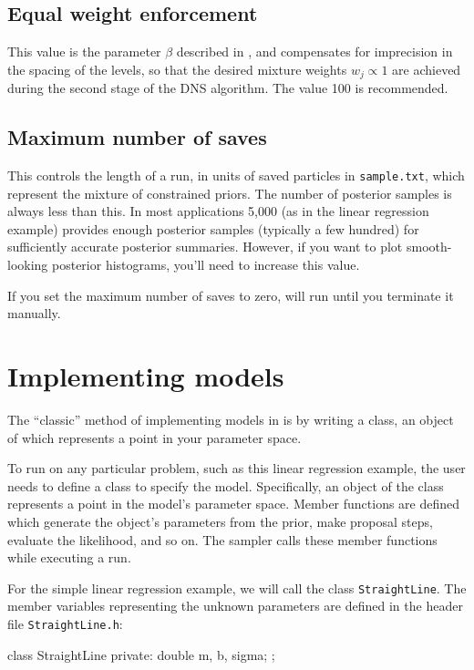 \documentclass[article, nojss]{jss}
\begin{document}
\subsection{Equal weight enforcement}
This value is the parameter $\beta$ described in
\citet{brewer2011diffusive}, and compensates
for imprecision in the spacing of the levels, so that the desired mixture
weights $w_j \propto 1$ are achieved during the second stage of the DNS
algorithm. The value 100 is recommended.

\subsection{Maximum number of saves}
This controls the length of a  run, in units of saved particles
in {\tt sample.txt}, which represent the mixture of constrained priors.
The number of posterior samples is always less than this. In most applications
5,000 (as in the linear regression example) provides enough posterior
samples (typically a few hundred) for sufficiently accurate posterior
summaries. However, if you want to plot smooth-looking posterior histograms,
you'll need to increase this value.

If you set the maximum number of saves to zero,  will run until
you terminate it manually.

\section{Implementing models}\label{sec:models}
The ``classic'' method of implementing models in  is by
writing a  class, an object of which represents a
point in your parameter space.

To run  on any particular problem, such as this linear regression
example, the user needs to define a  class to specify the
model. Specifically, an object of the class represents a point in the
model's parameter space. Member functions are defined which generate
the object's parameters from the prior, make proposal steps, evaluate the
likelihood, and so on. The sampler calls these member functions while
executing a run.

For the simple linear regression example, we will call the class
{\tt StraightLine}. The member variables representing the
unknown parameters are defined in the header file {\tt StraightLine.h}:

\begin{CodeChunk}
\begin{CodeInput}
class StraightLine
{
    private:
        double m, b, sigma;
};
\end{CodeInput}
\end{CodeChunk}
\end{document}
